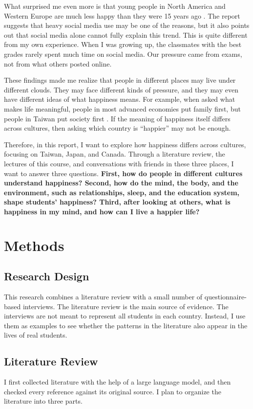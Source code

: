 \documentclass[12pt,a4paper]{article}
\begin{document}
What surprised me even more is that young people in North America and Western Europe are much less happy than they were 15 years ago \parencite{whr2026ch1}.
The report suggests that heavy social media use may be one of the reasons, but it also points out that social media alone cannot fully explain this trend.
This is quite different from my own experience.
When I was growing up, the classmates with the best grades rarely spent much time on social media.
Our pressure came from exams, not from what others posted online.

These findings made me realize that people in different places may live under different clouds.
They may face different kinds of pressure, and they may even have different ideas of what happiness means.
For example, when asked what makes life meaningful, people in most advanced economies put family first, but people in Taiwan put society first \parencite{pew2021meaningful}.
If the meaning of happiness itself differs across cultures, then asking which country is ``happier'' may not be enough.

Therefore, in this report, I want to explore how happiness differs across cultures, focusing on Taiwan, Japan, and Canada.
Through a literature review, the lectures of this course, and conversations with friends in these three places, I want to answer three questions.
\textbf{
First, how do people in different cultures understand happiness?
Second, how do the mind, the body, and the environment, such as relationships, sleep, and the education system, shape students' happiness?
Third, after looking at others, what is happiness in my mind, and how can I live a happier life?
}
\section{Methods}

\subsection{Research Design}
This research combines a literature review with a small number of questionnaire-based interviews. 
The literature review is the main source of evidence.
The interviews are not meant to represent all students in each country. 
Instead, I use them as examples to see whether the patterns in the literature also appear in the lives of real students.

\subsection{Literature Review}
I first collected literature with the help of a large language model, and then checked every reference against its original source. 
I plan to organize the literature into three parts.
\end{document}
